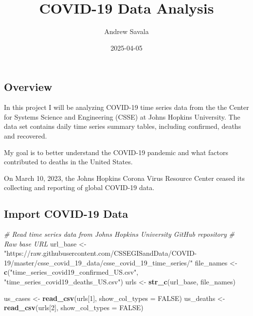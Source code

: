\documentclass[
]{article}
\title{COVID-19 Data Analysis}
\author{Andrew Savala}
\date{2025-04-05}
\newenvironment{Shaded}{\begin{snugshade}}{\end{snugshade}}
\newcommand{\AttributeTok}[1]{\textcolor[rgb]{0.13,0.29,0.53}{#1}}
\newcommand{\CommentTok}[1]{\textcolor[rgb]{0.56,0.35,0.01}{\textit{#1}}}
\newcommand{\ConstantTok}[1]{\textcolor[rgb]{0.56,0.35,0.01}{#1}}
\newcommand{\DecValTok}[1]{\textcolor[rgb]{0.00,0.00,0.81}{#1}}
\newcommand{\FunctionTok}[1]{\textcolor[rgb]{0.13,0.29,0.53}{\textbf{#1}}}
\newcommand{\NormalTok}[1]{#1}
\newcommand{\OtherTok}[1]{\textcolor[rgb]{0.56,0.35,0.01}{#1}}
\newcommand{\StringTok}[1]{\textcolor[rgb]{0.31,0.60,0.02}{#1}}
\begin{document}
\maketitle

\subsection{Overview}\label{overview}

In this project I will be analyzing COVID-19 time series data from the
the Center for Systems Science and Engineering (CSSE) at Johns Hopkins
University. The data set contains daily time series summary tables,
including confirmed, deaths and recovered.

My goal is to better understand the COVID-19 pandemic and what factors
contributed to deaths in the United States.

On March 10, 2023, the Johns Hopkins Corona Virus Resource Center ceased
its collecting and reporting of global COVID-19 data.

\subsection{Import COVID-19 Data}\label{import-covid-19-data}

\begin{Shaded}
\begin{Highlighting}[]
\CommentTok{\# Read time series data from Johns Hopkins University GitHub repository}
\CommentTok{\# Raw base URL}
\NormalTok{url\_base }\OtherTok{\textless{}{-}} \StringTok{"https://raw.githubusercontent.com/CSSEGISandData/COVID{-}19/master/csse\_covid\_19\_data/csse\_covid\_19\_time\_series/"}
\NormalTok{file\_names }\OtherTok{\textless{}{-}} \FunctionTok{c}\NormalTok{(}\StringTok{"time\_series\_covid19\_confirmed\_US.csv"}\NormalTok{,}
                \StringTok{"time\_series\_covid19\_deaths\_US.csv"}\NormalTok{)}
\NormalTok{urls }\OtherTok{\textless{}{-}} \FunctionTok{str\_c}\NormalTok{(url\_base, file\_names)}

\NormalTok{us\_cases }\OtherTok{\textless{}{-}} \FunctionTok{read\_csv}\NormalTok{(urls[}\DecValTok{1}\NormalTok{], }\AttributeTok{show\_col\_types =} \ConstantTok{FALSE}\NormalTok{)}
\NormalTok{us\_deaths }\OtherTok{\textless{}{-}} \FunctionTok{read\_csv}\NormalTok{(urls[}\DecValTok{2}\NormalTok{], }\AttributeTok{show\_col\_types =} \ConstantTok{FALSE}\NormalTok{)}
\end{Highlighting}
\end{Shaded}
\end{document}

